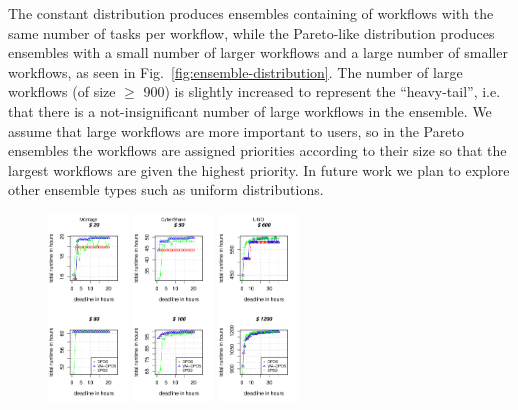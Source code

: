 \documentclass{sig-alternate}
\begin{document}
The constant distribution produces ensembles containing of workflows with the same number of tasks per workflow, 
while the Pareto-like distribution produces ensembles with a small number of larger 
workflows and a large number of smaller workflows, as seen in 
Fig.~\ref{fig:ensemble-distribution}. The number of large workflows (of size $\geq$ 900) 
is slightly increased to represent the ``heavy-tail'', i.e. that there is a 
not-insignificant number of large workflows in the ensemble. We assume that large
workflows are more important to users, so in the Pareto ensembles the workflows are 
assigned priorities according to their size so that the largest workflows are given 
the highest priority. In future work we plan to explore other ensemble types such as
uniform distributions.

\begin{figure}[t]  
\centering
\includegraphics[width=0.19\textwidth]{figures/pareto-size-MONTAGE-n-1000-8-dagh1-20m0.pdf}
\includegraphics[width=0.19\textwidth]{figures/pareto-size-CYBERSHAKE-n-1000-8-dagh1-20m0.pdf}
\includegraphics[width=0.19\textwidth]{figures/pareto-size-LIGO-n-1000-8-dagh1-40m0.pdf}

\end{figure}
\end{document}
